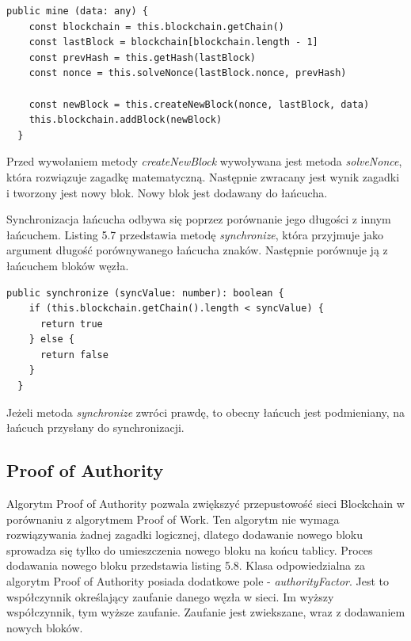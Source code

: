 \documentclass[a4paper,12pt]{book}
\begin{document}
\begin{lstlisting}[style=ES6, caption={Dodawanie nowego bloku. Metoda \textit{mine}.}]
  public mine (data: any) {
    const blockchain = this.blockchain.getChain()
    const lastBlock = blockchain[blockchain.length - 1]
    const prevHash = this.getHash(lastBlock)
    const nonce = this.solveNonce(lastBlock.nonce, prevHash)

    const newBlock = this.createNewBlock(nonce, lastBlock, data)
    this.blockchain.addBlock(newBlock)
  }
\end{lstlisting}

Przed wywołaniem metody \textit{createNewBlock} wywoływana jest metoda \textit{solveNonce}, która rozwiązuje zagadkę matematyczną. Następnie zwracany jest wynik zagadki i tworzony jest nowy blok. Nowy blok jest dodawany do łańcucha.

Synchronizacja łańcucha odbywa się poprzez porównanie jego długości z innym łańcuchem. Listing 5.7 przedstawia metodę \textit{synchronize}, która przyjmuje jako argument długość porównywanego łańcucha znaków. Następnie porównuje ją z łańcuchem bloków węzła.

\begin{lstlisting}[style=ES6, caption={Metoda \textit{synchronize}.}]
  public synchronize (syncValue: number): boolean {
    if (this.blockchain.getChain().length < syncValue) {
      return true
    } else {
      return false
    }
  }
\end{lstlisting}

Jeżeli metoda \textit{synchronize} zwróci prawdę, to obecny łańcuch jest podmieniany, na łańcuch przysłany do synchronizacji.

\subsection{Proof of Authority}

Algorytm Proof of Authority pozwala zwiększyć przepustowość sieci Blockchain w porównaniu z algorytmem Proof of Work. Ten algorytm nie wymaga rozwiązywania żadnej zagadki logicznej, dlatego dodawanie nowego bloku sprowadza się tylko do umieszczenia nowego bloku na końcu tablicy. Proces dodawania nowego bloku przedstawia listing 5.8. Klasa odpowiedzialna za algorytm Proof of Authority posiada dodatkowe pole - \textit{authorityFactor}. Jest to współczynnik określający zaufanie danego węzła w sieci. Im wyższy współczynnik, tym wyższe zaufanie. Zaufanie jest zwiekszane, wraz z dodawaniem nowych bloków.
\end{document}
